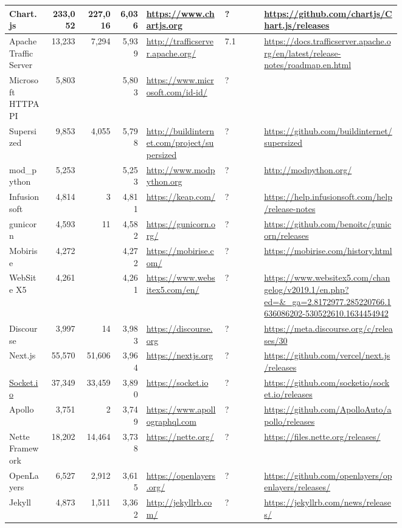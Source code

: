 \begin{landscape}
\begin{longtable}{|p{0.1\linewidth}|r|r|r|p{0.2\linewidth}|p{0.1\linewidth}|p{0.35\linewidth}|}
		Chart.js &233,052 &227,016 &6,036 &\url{https://www.chartjs.org} &? &\url{https://github.com/chartjs/Chart.js/releases} \\\hline
		Apache Traffic Server &13,233 &7,294 &5,939 &\url{http://trafficserver.apache.org/} &7.1 &\url{https://docs.trafficserver.apache.org/en/latest/release-notes/roadmap.en.html} \\\hline
		Microsoft HTTPAPI &5,803 & &5,803 &\url{https://www.microsoft.com/id-id/} &? & \\\hline
		Supersized &9,853 &4,055 &5,798 &\url{http://buildinternet.com/project/supersized} &? &\url{https://github.com/buildinternet/supersized} \\\hline
		mod\_python &5,253 & &5,253 &\url{http://www.modpython.org} &? &\url{http://modpython.org/} \\\hline
		Infusionsoft &4,814 &3 &4,811 &\url{https://keap.com/} &? &\url{https://help.infusionsoft.com/help/release-notes} \\\hline
		gunicorn &4,593 &11 &4,582 &\url{https://gunicorn.org/} &? &\url{https://github.com/benoitc/gunicorn/releases} \\\hline
		Mobirise &4,272 & &4,272 &\url{https://mobirise.com/} &? &\url{https://mobirise.com/history.html} \\\hline
		WebSite X5 &4,261 & &4,261 &\url{https://www.websitex5.com/en/} &? &\url{https://www.websitex5.com/changelog/v2019.1/en.php?ed=&\_ga=2.8172977.285220766.1636086202-530522610.1634454942} \\\hline
		Discourse &3,997 &14 &3,983 &\url{https://discourse.org} &? &\url{https://meta.discourse.org/c/releases/30} \\\hline
		Next.js &55,570 &51,606 &3,964 &\url{https://nextjs.org} &? &\url{https://github.com/vercel/next.js/releases} \\\hline
		\url{Socket.io} &37,349 &33,459 &3,890 &\url{https://socket.io} &? &\url{https://github.com/socketio/socket.io/releases} \\\hline
		Apollo &3,751 &2 &3,749 &\url{https://www.apollographql.com} &? &\url{https://github.com/ApolloAuto/apollo/releases} \\\hline
		Nette Framework &18,202 &14,464 &3,738 &\url{https://nette.org/} &? &\url{https://files.nette.org/releases/} \\\hline
		OpenLayers &6,527 &2,912 &3,615 &\url{https://openlayers.org/} &? &\url{https://github.com/openlayers/openlayers/releases/} \\\hline
		Jekyll &4,873 &1,511 &3,362 &\url{http://jekyllrb.com/} &? &\url{https://jekyllrb.com/news/releases/} \\\hline

\end{longtable}
\end{landscape}
